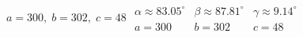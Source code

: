 { $a = 300, \; b = 302, \; c = 48$ \label{secondherons}}
{ $\begin{array}{lll}\alpha \approx 83.05^{\circ} & \beta \approx 87.81^{\circ} & \gamma \approx 9.14^{\circ} \\a = 300 & b = 302 & c = 48 \end{array}$}

